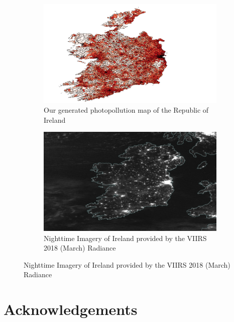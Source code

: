 \documentclass[12pt]{titlepage}
\begin{document}
\begin{figure}[h]
    \centering
    \caption{Our generated photopollution map compared against the VIIRS 2018 (March) Radiance}
    \begin{subfigure}{.49\textwidth}
        \centering
        \includegraphics[width=\textwidth]{photopollutionmap}
        \caption{Our generated photopollution map of the Republic of Ireland}
        \label{a}
    \end{subfigure}
    \hfill
    \begin{subfigure}{.49\textwidth}
        \centering
        \includegraphics[width=\textwidth]{ireland}
        \caption{Nighttime Imagery of Ireland provided by the VIIRS 2018 (March) Radiance}
        \label{b}
    \end{subfigure}
\end{figure}

\chapter*{Acknowledgements}

\end{document}
